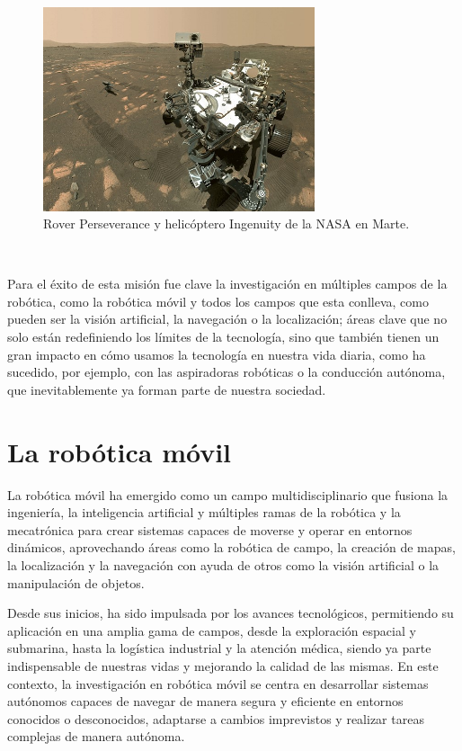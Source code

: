 \begin{figure} [h!]
  \begin{center}
    \includegraphics[width=8cm]{figs/perseverance_and_ingenuity_mars_rover_selfie}
  \end{center}
  \caption{Rover Perseverance y helicóptero Ingenuity de la NASA en Marte.}
  \label{fig:rover}
\end{figure}\

Para el éxito de esta misión fue clave la investigación en múltiples campos de
la robótica, como la robótica móvil y todos los campos que esta conlleva, como
pueden ser la visión artificial, la navegación o la localización; áreas clave
que no solo están redefiniendo los límites de la tecnología, sino que también
tienen un gran impacto en cómo usamos la tecnología en nuestra vida diaria, como
ha sucedido, por ejemplo, con las aspiradoras robóticas o la conducción
autónoma, que inevitablemente ya forman parte de nuestra sociedad.



\section{La robótica móvil}
\label{sec:robotica_movil} %

La robótica móvil ha emergido como un campo multidisciplinario que fusiona la
ingeniería, la inteligencia artificial y múltiples ramas de la robótica y la
mecatrónica para crear sistemas capaces de moverse y operar en entornos
dinámicos, aprovechando áreas como la robótica de campo, la creación de mapas,
la localización y la navegación con ayuda de otros como la visión artificial o
la manipulación de objetos.

Desde sus inicios, ha sido impulsada por los avances tecnológicos, permitiendo
su aplicación en una amplia gama de campos, desde la exploración espacial y
submarina, hasta la logística industrial y la atención médica, siendo ya parte
indispensable de nuestras vidas y mejorando la calidad de las mismas.
En este contexto, la investigación en robótica móvil se centra en desarrollar
sistemas autónomos capaces de navegar de manera segura y eficiente en entornos
conocidos o desconocidos, adaptarse a cambios imprevistos y realizar tareas
complejas de manera autónoma.

